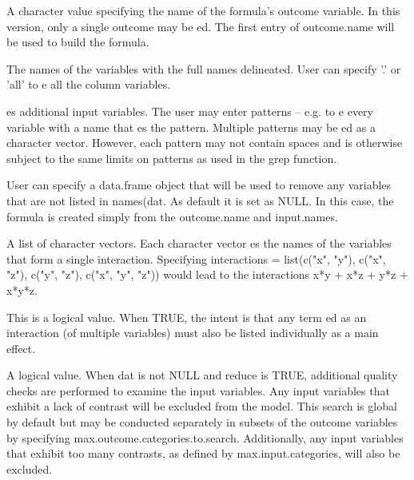 \documentclass[a4paper]{book}
\begin{document}
\begin{Arguments}
\begin{ldescription}
\item[\code{outcome.name}] A character value specifying the name of the formula's
outcome variable. In this version, only a single outcome may be ed. The
first entry of outcome.name will be used to build the formula.

\item[\code{input.names}] The names of the variables with the full names delineated.
User can specify '.' or 'all' to e all the column variables.

\item[\code{input.patterns}] es additional input variables. The user may enter
patterns -- e.g. to e every variable with a name that es the pattern.
Multiple patterns may be ed as a character vector. However, each pattern
may not contain spaces and is otherwise subject to the same limits on
patterns as used in the grep function.

\item[\code{dat}] User can specify a data.frame object that will be used to remove
any variables that are not listed in names(dat. As default it is set as NULL.
In this case, the formula is created simply from the
outcome.name and input.names.

\item[\code{interactions}] A list of character vectors. Each character vector es the
names of the variables that form a single interaction. Specifying
interactions = list(c("x", "y"), c("x", "z"), c("y", "z"), c("x", "y", "z"))
would lead to the interactions x*y + x*z + y*z + x*y*z.

\item[\code{force.main.effects}] This is a logical value. When TRUE, the intent is
that any term ed as an interaction (of multiple variables) must also be
listed individually as a main effect.

\item[\code{reduce}] A logical value. When dat is not NULL and reduce is TRUE,
additional quality checks are performed to examine the input variables.
Any input variables that exhibit a lack of contrast will be excluded from
the model. This search is global by default but may be conducted separately
in subsets of the outcome variables by specifying
max.outcome.categories.to.search. Additionally, any input variables that
exhibit too many contrasts, as defined by max.input.categories, will also
be excluded.


\end{ldescription}
\end{Arguments}
\end{document}
